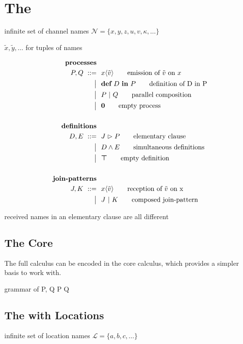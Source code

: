 \section{The \JoinCalc}

infinite set of channel names
$ \mathcal{N} = \{ x, y, z, u, v, \kappa, \ldots \} $

$ \tilde{x}, \tilde{y}, \ldots $ for tuples of names

\begin{align}
  \tag*{\textbf{processes}}
  \\
  P, Q
  \grmr \jsnd{x}{\tilde{v}}   \tag*{emission of $\tilde{v}$ on $x$}
  \altn \nonumber \jdef{D}{P} \tag*{definition of D in P}
  \altn P \jpar Q             \tag*{parallel composition}
  \altn \jnullproc            \tag*{empty process}
  \\ \nonumber
  \\
  \tag*{\textbf{definitions}}
  \\
  D, E
  \grmr \jrct{J}{P} \tag*{elementary clause}
  \altn D \jcon E   \tag*{simultaneous definitions}
  \altn \jnulldef   \tag*{empty definition}
  \\ \nonumber
  \\
  \tag*{\textbf{join-patterns}}
  \\
  J, K
  \grmr \jrcv{x}{\tilde{v}} \tag*{reception of $\tilde{v}$ on x}
  \altn J \jpat K           \tag*{composed join-pattern}
\end{align}

received names in an elementary clause are all different


\subsection{The Core \JoinCalc}

The full calculus can be encoded in the core calculus,
which provides a simpler basis to work with.

\begin{JDef}{grammar of \monadicjoincalc}
  P, Q
  \grmr {}
  \altn P \jpar Q
  \altn {}
\end{JDef}


\subsection{The \JoinCalc with Locations}

infinite set of location names
$ \mathcal{L} = \{ a, b, c, \ldots \} $

